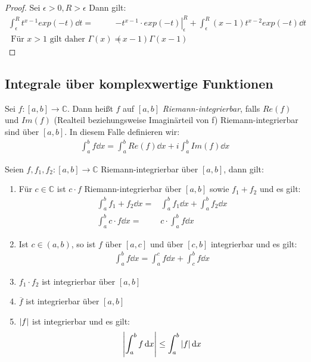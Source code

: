 \begin{proof}
	Sei $\epsilon > 0, R > \epsilon$ Dann gilt:
	\begin{align*}
		\int_{\epsilon}^{R}t^{x-1} exp(-t) \dd{t}  = & 
			\left. -t^{x-1} \cdot exp(-t) \right\vert_{\epsilon}^R 
			+ \int_{\epsilon}^{R}(x-1)t^{x-2}exp(-t) \dd{t} \\
			\text{ Für } x > 1 \text{ gilt daher }
			\Gamma(x) = &  (x-1) \Gamma(x-1)
	\end{align*}
\end{proof}

\subsection{Integrale über komplexwertige Funktionen}

\begin{Definition}{
	Sei $f: [a,b] \rightarrow \mathbb{C}$. Dann heißt $f$ auf $[a,b]$ 
	\emph{Riemann-integrierbar}, falls $Re(f)$ und $Im(f)$ (Realteil beziehungsweise 
	Imaginärteil von f) Riemann-integrierbar sind über $[a,b]$. In diesem Falle 
	definieren wir:
	\begin{align*}
		\int_a^b f \dd{x} = \int_a^b Re(f) \dd{x} + i \int_a^b Im(f) \dd{x}
	\end{align*}
}\end{Definition}

\begin{Satz}{
	Seien $f, f_1, f_2: [a,b] \rightarrow \mathbb{C}$ Riemann-integrierbar über 
	$[a,b]$, dann gilt:
	\renewcommand{\labelenumi}{\alph{enumi})}
	\begin{enumerate}
		\item Für $c \in \mathbb{C}$ ist $c \cdot f$ Riemann-integrierbar über 
		$[a,b]$ sowie $f_1 + f_2$ und es gilt:
		\begin{align*}
			\int_a^b f_1 + f_2 \dd{x} = &\int_a^b f_1 \dd{x} + \int_a^b f_2 \dd{x}\\
			\int_a^b c \cdot f \dd{x} = & c \cdot \int_a^b f \dd{x} 
		\end{align*}
		\item Ist $ c \in (a,b)$, so ist $f$ über $[a,c]$ und über $[c,b]$ 
		integrierbar und es gilt:
		\begin{align*}
			\int_a^b f \dd{x} = \int_a^c f \dd{x} + \int_c^b f \dd{x}
		\end{align*}
		\item $f_1 \cdot f_2$ ist integrierbar über $[a,b]$
		\item $\overline{f}$ ist integrierbar über $[a,b]$
		\item $\abs{f}$ ist integrierbar und es gilt:
		\begin{align*}
			\abs{\int_a^b f \dd{x} } \leq \int_a^b \abs{f} \dd{x}
		\end{align*}
	\end{enumerate}
}\end{Satz}

